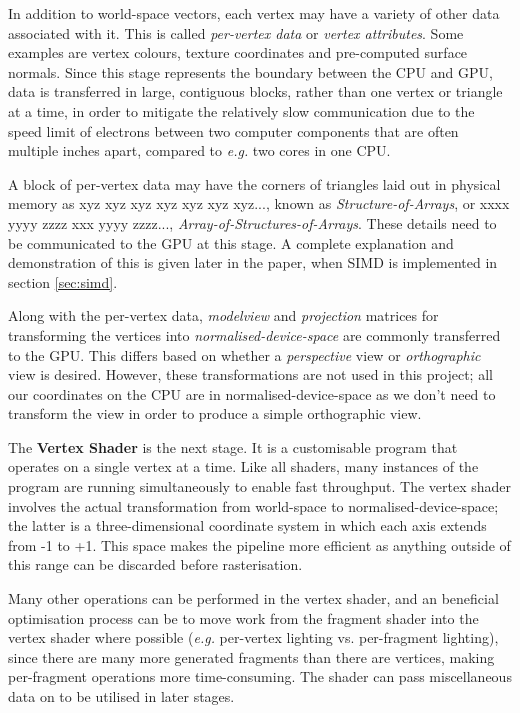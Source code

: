\documentclass[11pt, a4paper, twocolumn]{article}
\begin{document}
In addition to world-space vectors, each vertex may have a variety of other data associated with it. This is called \emph{per-vertex data} or \emph{vertex attributes}. Some examples are vertex colours, texture coordinates and pre-computed surface normals. Since this stage represents the boundary between the CPU and GPU, data is transferred in large, contiguous blocks, rather than one vertex or triangle at a time, in order to mitigate the relatively slow communication due to the speed limit of electrons between two computer components that are often multiple inches apart, compared to \emph{e.g.} two cores in one CPU.

A block of per-vertex data may have the corners of triangles laid out in physical memory as xyz xyz xyz xyz xyz xyz xyz..., known as \emph{Structure-of-Arrays}, or xxxx yyyy zzzz xxx yyyy zzzz..., \emph{Array-of-Structures-of-Arrays}. These details need to be communicated to the GPU at this stage. A complete explanation and demonstration of this is given later in the paper, when SIMD is implemented in section \ref{sec:simd}.

Along with the per-vertex data, \emph{modelview} and \emph{projection} matrices for transforming the vertices into \emph{normalised-device-space} are commonly transferred to the GPU. This differs based on whether a \emph{perspective} view or \emph{orthographic} view is desired. However, these transformations are not used in this project; all our coordinates on the CPU are in normalised-device-space as we don't need to transform the view in order to produce a simple orthographic view.

The \textbf{Vertex Shader} is the next stage. It is a customisable program that operates on a single vertex at a time. Like all shaders, many instances of the program are running simultaneously to enable fast throughput. The vertex shader involves the actual transformation from world-space to normalised-device-space; the latter is a three-dimensional coordinate system in which each axis extends from -1 to +1. This space makes the pipeline more efficient as anything outside of this range can be discarded before rasterisation.

Many other operations can be performed in the vertex shader, and an beneficial optimisation process can be to move work from the fragment shader into the vertex shader where possible (\emph{e.g.} per-vertex lighting vs. per-fragment lighting), since there are many more generated fragments than there are vertices, making per-fragment operations more time-consuming. The shader can pass miscellaneous data on to be utilised in later stages.
\end{document}
